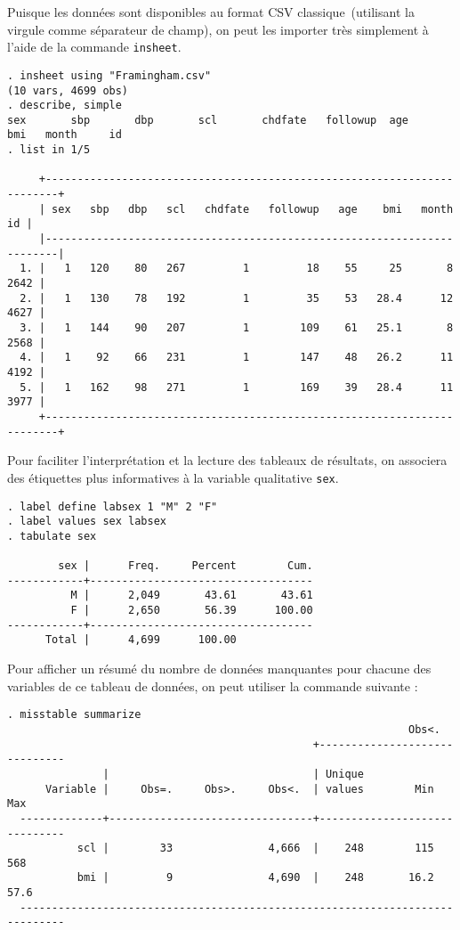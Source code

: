\soln{\ref{exo:10.3}}
Puisque les données sont disponibles au format CSV \og classique\fg\
(utilisant la virgule comme séparateur de champ), on peut les importer très
simplement à l'aide de la commande \texttt{insheet}. 
\begin{verbatim}
. insheet using "Framingham.csv"
(10 vars, 4699 obs)
. describe, simple
sex       sbp       dbp       scl       chdfate   followup  age       bmi   month     id
. list in 1/5

     +------------------------------------------------------------------------+
     | sex   sbp   dbp   scl   chdfate   followup   age    bmi   month     id |
     |------------------------------------------------------------------------|
  1. |   1   120    80   267         1         18    55     25       8   2642 |
  2. |   1   130    78   192         1         35    53   28.4      12   4627 |
  3. |   1   144    90   207         1        109    61   25.1       8   2568 |
  4. |   1    92    66   231         1        147    48   26.2      11   4192 |
  5. |   1   162    98   271         1        169    39   28.4      11   3977 |
     +------------------------------------------------------------------------+
\end{verbatim}
Pour faciliter l'interprétation et la lecture des tableaux de résultats, on
associera des étiquettes plus informatives à la variable qualitative \texttt{sex}.
\begin{verbatim}
. label define labsex 1 "M" 2 "F"
. label values sex labsex
. tabulate sex

        sex |      Freq.     Percent        Cum.
------------+-----------------------------------
          M |      2,049       43.61       43.61
          F |      2,650       56.39      100.00
------------+-----------------------------------
      Total |      4,699      100.00
\end{verbatim}
Pour afficher un résumé du nombre de données manquantes pour chacune des
variables de ce tableau de données, on peut utiliser la commande suivante :
\begin{verbatim}
. misstable summarize
                                                               Obs<.
                                                +------------------------------
               |                                | Unique
      Variable |     Obs=.     Obs>.     Obs<.  | values        Min         Max
  -------------+--------------------------------+------------------------------
           scl |        33               4,666  |    248        115         568
           bmi |         9               4,690  |    248       16.2        57.6
  -----------------------------------------------------------------------------
\end{verbatim}

